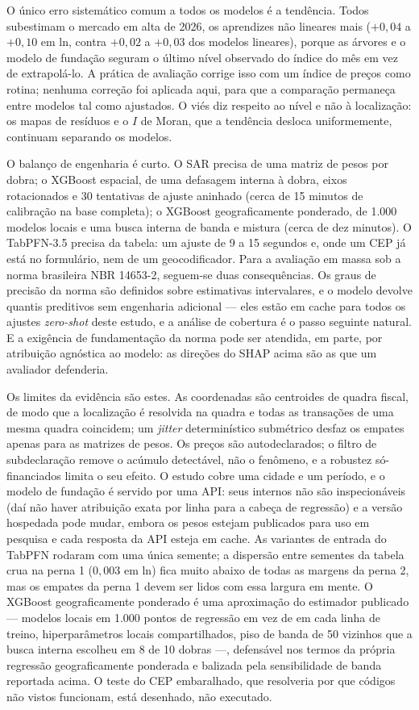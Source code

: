 \documentclass[11pt,a4paper]{article}
\begin{document}
O único erro sistemático comum a todos os modelos é a tendência. Todos subestimam o mercado em
alta de 2026, os aprendizes não lineares mais ($+0{,}04$ a $+0{,}10$ em ln, contra $+0{,}02$ a
$+0{,}03$ dos modelos lineares), porque as árvores e o modelo de fundação seguram o último
nível observado do índice do mês em vez de extrapolá-lo. A prática de avaliação corrige isso
com um índice de preços como rotina; nenhuma correção foi aplicada aqui, para que a comparação
permaneça entre modelos tal como ajustados. O viés diz respeito ao nível e não à localização: os
mapas de resíduos e o $I$ de Moran, que a tendência desloca uniformemente, continuam separando
os modelos.

O balanço de engenharia é curto. O SAR precisa de uma matriz de pesos por dobra; o XGBoost
espacial, de uma defasagem interna à dobra, eixos rotacionados e 30 tentativas de ajuste
aninhado (cerca de 15 minutos de calibração na base completa); o XGBoost geograficamente
ponderado, de 1.000 modelos locais e uma busca interna de banda e mistura (cerca de dez
minutos). O TabPFN-3.5 precisa da tabela: um ajuste de 9 a 15 segundos e, onde um CEP já está
no formulário, nem de um geocodificador. Para a avaliação em massa sob a norma brasileira
NBR 14653-2, seguem-se duas consequências. Os graus de precisão da norma são definidos sobre
estimativas intervalares, e o modelo devolve quantis preditivos sem engenharia adicional ---
eles estão em cache para todos os ajustes \emph{zero-shot} deste estudo, e a análise de
cobertura é o passo seguinte natural. E a exigência de fundamentação da norma pode ser
atendida, em parte, por atribuição agnóstica ao modelo: as direções do SHAP acima são as que um
avaliador defenderia.

Os limites da evidência são estes. As coordenadas são centroides de quadra fiscal, de modo que
a localização é resolvida na quadra e todas as transações de uma mesma quadra coincidem; um
\emph{jitter} determinístico submétrico desfaz os empates apenas para as matrizes de pesos. Os
preços são autodeclarados; o filtro de subdeclaração remove o acúmulo detectável, não o
fenômeno, e a robustez só-financiados limita o seu efeito. O estudo cobre uma cidade e um
período, e o modelo de fundação é servido por uma API: seus internos não são inspecionáveis
(daí não haver atribuição exata por linha para a cabeça de regressão) e a versão hospedada pode
mudar, embora os pesos estejam publicados para uso em pesquisa e cada resposta da API esteja em
cache. As variantes de entrada do TabPFN rodaram com uma única semente; a dispersão entre
sementes da tabela crua na perna 1 ($0{,}003$ em ln) fica muito abaixo de todas as margens da
perna 2, mas os empates da perna 1 devem ser lidos com essa largura em mente. O XGBoost
geograficamente ponderado é uma aproximação do estimador publicado --- modelos locais em 1.000
pontos de regressão em vez de em cada linha de treino, hiperparâmetros locais compartilhados,
piso de banda de 50 vizinhos que a busca interna escolheu em 8 de 10 dobras ---, defensável nos
termos da própria regressão geograficamente ponderada e balizada pela sensibilidade de banda
reportada acima. O teste do CEP embaralhado, que resolveria por que códigos não vistos
funcionam, está desenhado, não executado.
\end{document}
